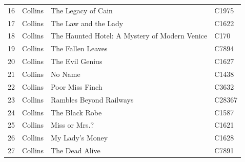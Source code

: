 \documentclass[a4paper,10pt,twoside,fleqn]{article}
\begin{document}
\begin{table}
\begin{minipage}{.62\linewidth}
\begin{tabular}{c l l l }
16		& Collins			& The Legacy of Cain		& C1975       \\
17		& Collins			& The Law and the Lady		& C1622         \\
18		& Collins			& The Haunted Hotel: A Mystery of Modern Venice	&    C170              \\
19		& Collins			& The Fallen Leaves		& C7894           \\
20		& Collins			& The Evil Genius		& C1627           \\
21		& Collins			& No Name			& C1438        \\
22		& Collins			& Poor Miss Finch		& C3632           \\
23		& Collins			& Rambles Beyond Railways	& C28367         \\
24		& Collins			& The Black Robe		& C1587      \\
25		& Collins			& Miss or Mrs.?			& C1621          \\
26		& Collins			& My Lady's Money		& C1628         \\
27		& Collins			& The Dead Alive		& C7891        \\
\bottomrule
\end{tabular}

    \end{minipage} 
\end{table}
\end{document}
